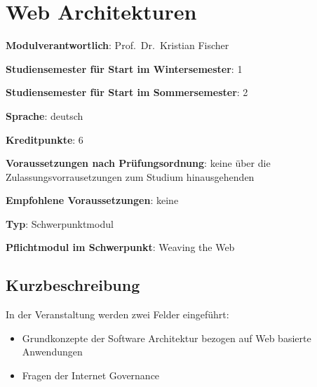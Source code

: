 \chapter{Web
Architekturen\label{/mi-2017/modulbeschreibungen-master/MA_WTW_Modul_Web-Architekturen}}\label{web-architekturenpathlabelmi-2017modulbeschreibungen-mastermaux5fwtwux5fmodulux5fweb-architekturen}

\begin{modulHead}
\textbf{Modulverantwortlich}: Prof.~Dr.~Kristian
Fischer
\end{modulHead}
\begin{modulHead}
\textbf{Studiensemester für
Start im Wintersemester}:
1
\end{modulHead}
\begin{modulHead}
\textbf{Studiensemester für Start
im Sommersemester}:
2
\end{modulHead}
\begin{modulHead}
\textbf{Sprache}:
deutsch
\end{modulHead}
\begin{modulHead}
\textbf{Kreditpunkte}:
6
\end{modulHead}
\begin{modulHead}
\textbf{Voraussetzungen nach
Prüfungsordnung}: keine über die Zulassungsvorrausetzungen zum Studium
hinausgehenden
\end{modulHead}
\begin{modulHead}
\textbf{Empfohlene
Voraussetzungen}: keine
\end{modulHead}
\begin{modulHead}
\textbf{Typ}:
Schwerpunktmodul
\end{modulHead}
\begin{modulHead}
\textbf{Pflichtmodul
im Schwerpunkt}: Weaving the Web
\end{modulHead}


\section*{Kurzbeschreibung\label{/mi-2017/modulbeschreibungen-master/MA_WTW_Modul_Web-Architekturen}}\label{kurzbeschreibungpathlabelmi-2017modulbeschreibungen-mastermaux5fwtwux5fmodulux5fweb-architekturen}

In der Veranstaltung werden zwei Felder eingeführt:

\begin{itemize}
\tightlist
\item
  Grundkonzepte der Software Architektur bezogen auf Web basierte
  Anwendungen
\item
  Fragen der Internet Governance
\end{itemize}

